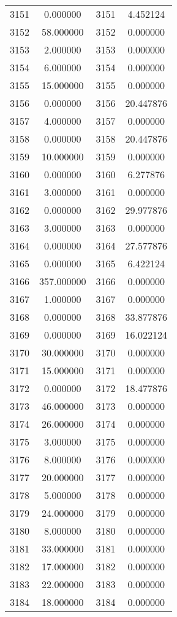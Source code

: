\documentclass[12pt]{article}
\begin{document}
\begin{longtable}{@{}cccc@{}}
3151 & 0.000000 & 3151 & 4.452124 \\
3152 & 58.000000 & 3152 & 0.000000 \\
3153 & 2.000000 & 3153 & 0.000000 \\
3154 & 6.000000 & 3154 & 0.000000 \\
3155 & 15.000000 & 3155 & 0.000000 \\
3156 & 0.000000 & 3156 & 20.447876 \\
3157 & 4.000000 & 3157 & 0.000000 \\
3158 & 0.000000 & 3158 & 20.447876 \\
3159 & 10.000000 & 3159 & 0.000000 \\
3160 & 0.000000 & 3160 & 6.277876 \\
3161 & 3.000000 & 3161 & 0.000000 \\
3162 & 0.000000 & 3162 & 29.977876 \\
3163 & 3.000000 & 3163 & 0.000000 \\
3164 & 0.000000 & 3164 & 27.577876 \\
3165 & 0.000000 & 3165 & 6.422124 \\
3166 & 357.000000 & 3166 & 0.000000 \\
3167 & 1.000000 & 3167 & 0.000000 \\
3168 & 0.000000 & 3168 & 33.877876 \\
3169 & 0.000000 & 3169 & 16.022124 \\
3170 & 30.000000 & 3170 & 0.000000 \\
3171 & 15.000000 & 3171 & 0.000000 \\
3172 & 0.000000 & 3172 & 18.477876 \\
3173 & 46.000000 & 3173 & 0.000000 \\
3174 & 26.000000 & 3174 & 0.000000 \\
3175 & 3.000000 & 3175 & 0.000000 \\
3176 & 8.000000 & 3176 & 0.000000 \\
3177 & 20.000000 & 3177 & 0.000000 \\
3178 & 5.000000 & 3178 & 0.000000 \\
3179 & 24.000000 & 3179 & 0.000000 \\
3180 & 8.000000 & 3180 & 0.000000 \\
3181 & 33.000000 & 3181 & 0.000000 \\
3182 & 17.000000 & 3182 & 0.000000 \\
3183 & 22.000000 & 3183 & 0.000000 \\
3184 & 18.000000 & 3184 & 0.000000 \\

\end{longtable}
\end{document}
